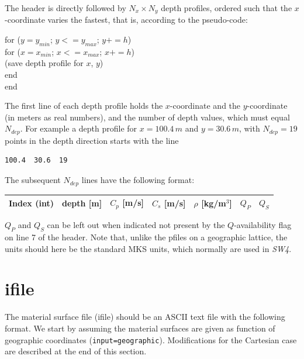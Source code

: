 \documentclass[11pt]{report}
\begin{document}
The header is directly followed by $N_{x}\times N_{y}$ depth profiles, ordered such that the $x$-coordinate
varies the fastest, that is, according to the pseudo-code:
\begin{flushleft}
\hspace{10mm}  for ($y= y_{min}$; $y <= y_{max}$; $y += h$)\\
\hspace{20mm}    for ($x= x_{min}$; $x <= x_{max}$; $x += h$)\\
\hspace{30mm}      (save depth profile for $x$, $y$)\\
\hspace{20mm}    end\\
\hspace{10mm}  end
\end{flushleft}
The first line of each depth profile holds the $x$-coordinate and the $y$-coordinate (in meters as real
numbers), and the number of depth values, which must equal $N_{dep}$. For example a depth profile
for $x=100.4\,m$ and $y=30.6\,m$, with $N_{dep}=19$ points in the depth direction starts with the line
\begin{verbatim}
100.4  30.6  19
\end{verbatim}
The subsequent $N_{dep}$ lines have the following format:
\begin{center}
\begin{tabular}{lllllll}\hline
Index (int)& depth [m] & $C_p$ [m/s] &  $C_s$ [m/s] & $\rho$ [kg/m$^3$] & $Q_P$ & $Q_S$ \\ \hline
\end{tabular}
\end{center}
$Q_P$ and $Q_S$ can be left out when indicated not present by the $Q$-availability flag on line 7 of
the header.  Note that, unlike the pfiles on a geographic lattice, the units should here be
the standard MKS units, which normally are used in \emph{SW4}.


\section{ifile}\label{sec:ifile-format}

The material surface file (ifile) should be an ASCII text file with the following format. We start
by assuming the material surfaces are given as function of geographic coordinates
(\verb+input=geographic+). Modifications for the Cartesian case are described at the end of this
section.
\end{document}
